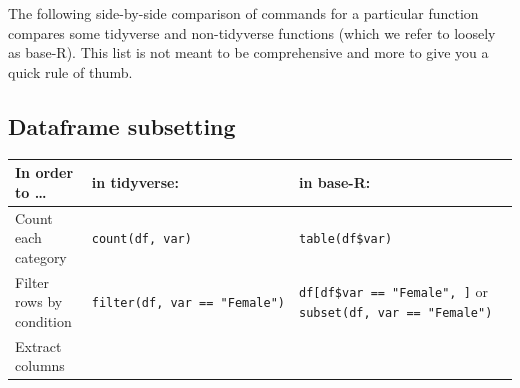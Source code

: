 \documentclass[]{book}
\theoremstyle{definition}
\theoremstyle{definition}
\theoremstyle{definition}
\theoremstyle{remark}
\begin{document}
The following side-by-side comparison of commands for a particular function compares some tidyverse and non-tidyverse functions (which we refer to loosely as base-R). This list is not meant to be comprehensive and more to give you a quick rule of thumb.

\hypertarget{dataframe-subsetting}{%
\subsection*{Dataframe subsetting}\label{dataframe-subsetting}}

\begin{longtable}[]{@{}lll@{}}
\toprule
\begin{minipage}[b]{0.29\columnwidth}\raggedright
In order to \ldots{}\strut
\end{minipage} & \begin{minipage}[b]{0.33\columnwidth}\raggedright
in tidyverse:\strut
\end{minipage} & \begin{minipage}[b]{0.30\columnwidth}\raggedright
in base-R:\strut
\end{minipage}\tabularnewline
\midrule
\endhead
\begin{minipage}[t]{0.29\columnwidth}\raggedright
Count each category\strut
\end{minipage} & \begin{minipage}[t]{0.33\columnwidth}\raggedright
\texttt{count(df,\ var)}\strut
\end{minipage} & \begin{minipage}[t]{0.30\columnwidth}\raggedright
\texttt{table(df\$var)}\strut
\end{minipage}\tabularnewline
\begin{minipage}[t]{0.29\columnwidth}\raggedright
Filter rows by condition\strut
\end{minipage} & \begin{minipage}[t]{0.33\columnwidth}\raggedright
\texttt{filter(df,\ var\ ==\ "Female")}\strut
\end{minipage} & \begin{minipage}[t]{0.30\columnwidth}\raggedright
\texttt{df{[}df\$var\ ==\ "Female",\ {]}} or \texttt{subset(df,\ var\ ==\ "Female")}\strut
\end{minipage}\tabularnewline
\begin{minipage}[t]{0.29\columnwidth}\raggedright
Extract columns\strut
\end{minipage} & \begin{minipage}[t]{0.33\columnwidth}\raggedright

\end{minipage}
\end{longtable}
\end{document}
